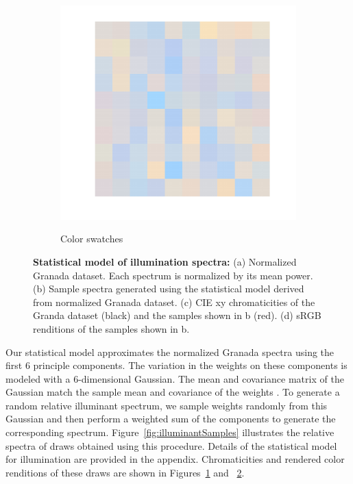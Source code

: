 \documentclass{jov}
\begin{document}
\begin{figure}
\begin{subfigure}[b]{0.24 \textwidth}
        \label{fig:xyDiagram}
        \end{subfigure}
      	\begin{subfigure}[b]{0.24 \textwidth}
    \centering
        \caption{Color swatches}
        \includegraphics[width=\textwidth]{../FiguresDraft5/Figure6/Figure6_d.pdf}
        \label{fig:sRGBIlluminant}
    \end{subfigure}
    \caption{{\bf Statistical model of illumination spectra:} (a) Normalized Granada dataset. Each spectrum is normalized by its mean power. (b) Sample spectra generated using the statistical model derived from normalized Granada dataset. (c) CIE xy chromaticities of the Granda dataset (black) and the samples shown in b (red). (d) sRGB renditions of the samples shown in b.}
\label{fig:illuminant}
\end{figure}

Our statistical model approximates the normalized Granada spectra using the first 6 principle components.
The variation in the weights on these components is modeled with a 6-dimensional Gaussian.
The mean and covariance matrix of the Gaussian match the sample mean and covariance of the weights \cite{BrainardFreeman}. 
To generate a random relative illuminant spectrum, we sample weights randomly from this Gaussian and then perform a weighted sum of the components to generate the corresponding spectrum.
Figure~\ref{fig:illuminantSamples} illustrates the relative spectra of draws obtained using this procedure.
Details of the statistical model for illumination are provided in the appendix.
Chromaticities and rendered color renditions of these draws are shown in Figures~\ref{fig:xyDiagram} and ~\ref{fig:sRGBIlluminant}.
\end{document}
